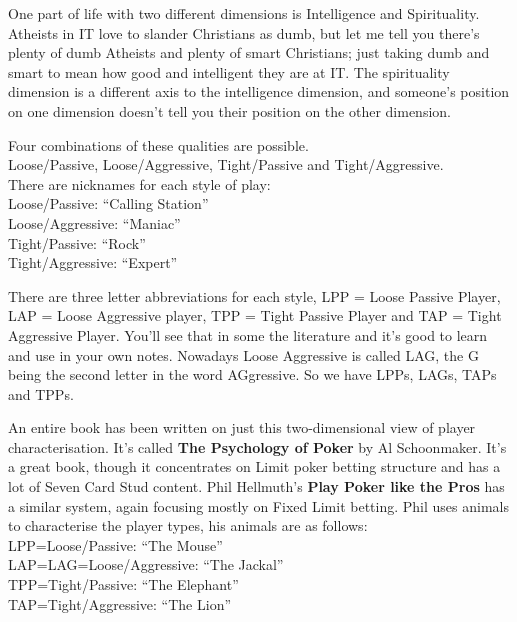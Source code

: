 
One part of life with two different dimensions is Intelligence and
Spirituality. Atheists in IT love to slander Christians as dumb,
but let me tell you there's plenty of dumb Atheists and plenty of
smart Christians; just taking dumb and smart to mean how good and
intelligent they are at IT. The spirituality dimension is a different
axis to the intelligence dimension, and someone's position on one
dimension doesn't tell you their position on the other dimension.


Four combinations of these qualities are possible. \\
Loose/Passive, Loose/Aggressive, Tight/Passive and Tight/Aggressive. \\
There are nicknames for each style of play: \\
Loose/Passive: ``Calling Station'' \\
Loose/Aggressive: ``Maniac'' \\
Tight/Passive: ``Rock'' \\
Tight/Aggressive: ``Expert''

There are three letter abbreviations for each style, LPP = Loose
Passive Player, LAP = Loose Aggressive player, TPP = Tight Passive
Player and TAP = Tight Aggressive Player. You'll see that in some the
literature and it's good to learn and use in your own notes. Nowadays
Loose Aggressive is called LAG, the G being the second letter in the
word AGgressive. So we have LPPs, LAGs, TAPs and TPPs.


An entire book has been written on just this two-dimensional view
of player characterisation. It's called \textbf{The Psychology of Poker}
by Al Schoonmaker. It's a great book, though it concentrates
on Limit poker betting structure and has a lot of Seven Card Stud
content. Phil Hellmuth's \textbf{Play Poker like the Pros} has a
similar system, again focusing mostly on Fixed Limit betting.
Phil uses animals to characterise the player types, his animals are
as follows: \\
LPP=Loose/Passive: ``The Mouse'' \\
LAP=LAG=Loose/Aggressive: ``The Jackal'' \\
TPP=Tight/Passive: ``The Elephant'' \\
TAP=Tight/Aggressive: ``The Lion''

